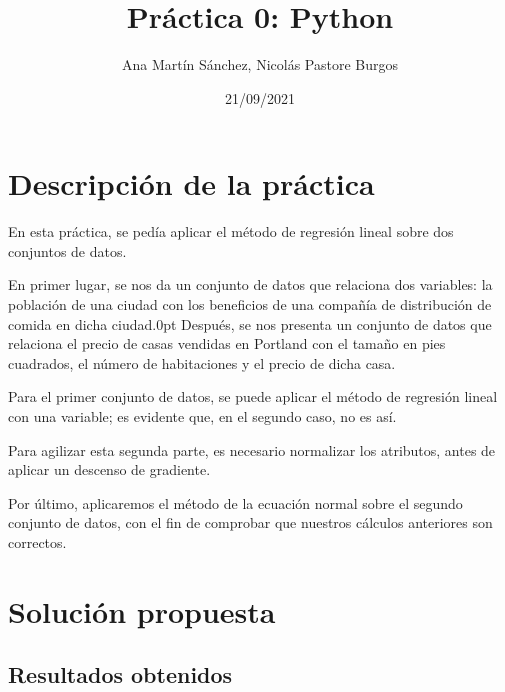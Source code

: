 \documentclass[11pt]{article}
\title{Práctica 0: Python}
\author{Ana Martín Sánchez, Nicolás Pastore Burgos}
\date{21/09/2021}
\begin{document}
\maketitle

\section{Descripción de la práctica}

 En esta práctica, se pedía aplicar el método de regresión lineal sobre dos conjuntos de datos. 
 
 En primer lugar, se nos da un conjunto de datos que relaciona dos variables: la población de una ciudad con los beneficios de una compañía de distribución de comida en dicha ciudad.0pt
 Después, se nos presenta un conjunto de datos que relaciona el precio de casas vendidas en Portland con el tamaño en pies cuadrados, el número de habitaciones y el precio de dicha casa.

 Para el primer conjunto de datos, se puede aplicar el método de regresión lineal con una variable; es evidente que, en el segundo caso, no es así.

 Para agilizar esta segunda parte, es necesario normalizar los atributos, antes de aplicar un descenso de gradiente.

 Por último, aplicaremos el método de la ecuación normal sobre el segundo conjunto de datos, con el fin de comprobar que nuestros cálculos anteriores son correctos.


\newpage
\section{Solución propuesta}

\subsection{Resultados obtenidos}
\end{document}
